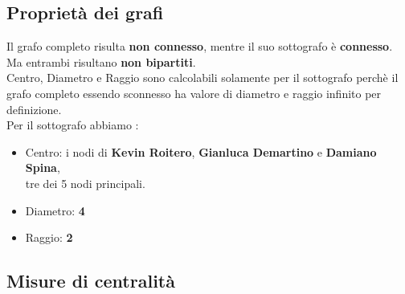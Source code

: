 \documentclass[a4paper,11pt]{report}
\begin{document}
\subsection{Proprietà dei grafi}
Il grafo completo risulta \textbf{non connesso}, mentre il suo sottografo è \textbf{connesso}.\\
Ma entrambi risultano \textbf{non bipartiti}.\\
Centro, Diametro e Raggio sono calcolabili solamente per il sottografo perchè il grafo completo essendo sconnesso ha valore di diametro e raggio infinito per definizione.\\
Per il sottografo abbiamo :
		\begin{itemize}
			\item Centro: i nodi di \textbf{Kevin Roitero}, \textbf{Gianluca Demartino} e \textbf{Damiano Spina},\\ tre dei 5 nodi principali.
			\item Diametro:  \textbf{4}
			\item Raggio: \textbf{2}
		\end{itemize}
\subsection{Misure di centralità}
\end{document}

